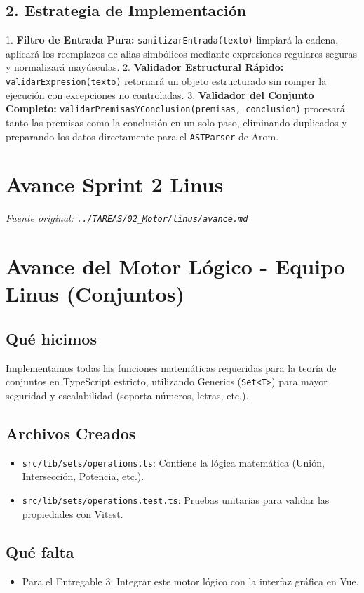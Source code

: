 \documentclass[11pt,a4paper,openany]{book}
\begin{document}
\hrulefill

\subsection{2. Estrategia de Implementación}
1. \textbf{Filtro de Entrada Pura:} \texttt{sanitizarEntrada(texto)} limpiará la cadena, aplicará los reemplazos de alias simbólicos mediante expresiones regulares seguras y normalizará mayúsculas.
2. \textbf{Validador Estructural Rápido:} \texttt{validarExpresion(texto)} retornará un objeto estructurado sin romper la ejecución con excepciones no controladas.
3. \textbf{Validador del Conjunto Completo:} \texttt{validarPremisasYConclusion(premisas, conclusion)} procesará tanto las premisas como la conclusión en un solo paso, eliminando duplicados y preparando los datos directamente para el \texttt{ASTParser} de Arom.


\section{Avance Sprint 2 Linus}
\textit{Fuente original: \texttt{../TAREAS/02\_Motor/linus/avance.md}}

\section{Avance del Motor Lógico - Equipo Linus (Conjuntos)}

\subsection{Qué hicimos}
Implementamos todas las funciones matemáticas requeridas para la teoría de conjuntos en TypeScript estricto, utilizando Generics (\texttt{Set<T>}) para mayor seguridad y escalabilidad (soporta números, letras, etc.).

\subsection{Archivos Creados}
\begin{itemize}[leftmargin=*]
\item \texttt{src/lib/sets/operations.ts}: Contiene la lógica matemática (Unión, Intersección, Potencia, etc.).
\item \texttt{src/lib/sets/operations.test.ts}: Pruebas unitarias para validar las propiedades con Vitest.
\end{itemize}

\subsection{Qué falta}
\begin{itemize}[leftmargin=*]
\item Para el Entregable 3: Integrar este motor lógico con la interfaz gráfica en Vue.
\end{itemize}
\end{document}
